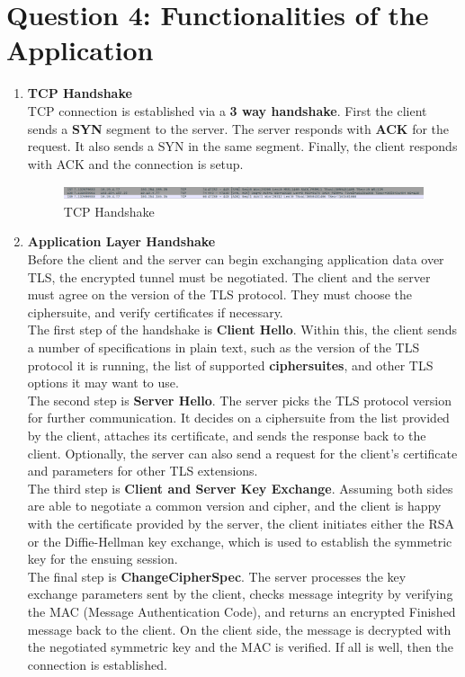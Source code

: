 \documentclass[a4paper,10pt]{article}
\begin{document}
\section*{Question 4: Functionalities of the Application}
\begin{enumerate}
	\item \textbf{\color{Magenta} \large TCP Handshake}\\
	TCP connection is established via a \textbf{3 way handshake}. First the client sends a \textbf{SYN} segment to the server. The server responds with \textbf{ACK} for the request. It also sends a SYN in the same segment. Finally, the client responds with ACK and the connection is setup.
	\begin{figure}[h]
		\includegraphics[width=\textwidth]{Images/TCP_handshake}
		\caption{TCP Handshake}
	\end{figure}
	\item \textbf{\color{Magenta} \large Application Layer Handshake}\\
	Before the client and the server can begin exchanging application data over TLS, the encrypted tunnel must be negotiated. The client and the server must agree on the version of the TLS protocol. They must choose the ciphersuite, and verify certificates if necessary.
	\\
	The first step of the handshake is \textbf{Client Hello}. Within this, the client sends a number of specifications in plain text, such as the version of the TLS protocol it is running, the list of supported \textbf{ciphersuites}, and other TLS options it may want to use.
	\\The second step is \textbf{Server Hello}. The server picks the TLS protocol version for further communication. It decides on a ciphersuite from the list provided by the client, attaches its certificate, and sends the response back to the client. Optionally, the server can also send a request for the client's certificate and parameters for other TLS extensions. 
	\\The third step is \textbf{Client and Server Key Exchange}. Assuming both sides are able to negotiate a common version and cipher, and the client is happy with the certificate provided by the server, the client initiates either the RSA or the Diffie-Hellman key exchange, which is used to establish the symmetric key for the ensuing session.
	\\The final step is \textbf{ChangeCipherSpec}. The server processes the key exchange parameters sent by the client, checks message integrity by verifying the MAC (Message Authentication Code), and returns an encrypted Finished message back to the client. On the client side, the message is decrypted with the negotiated symmetric key and the MAC is verified. If all is well, then the connection is established.

\end{enumerate}
\end{document}
